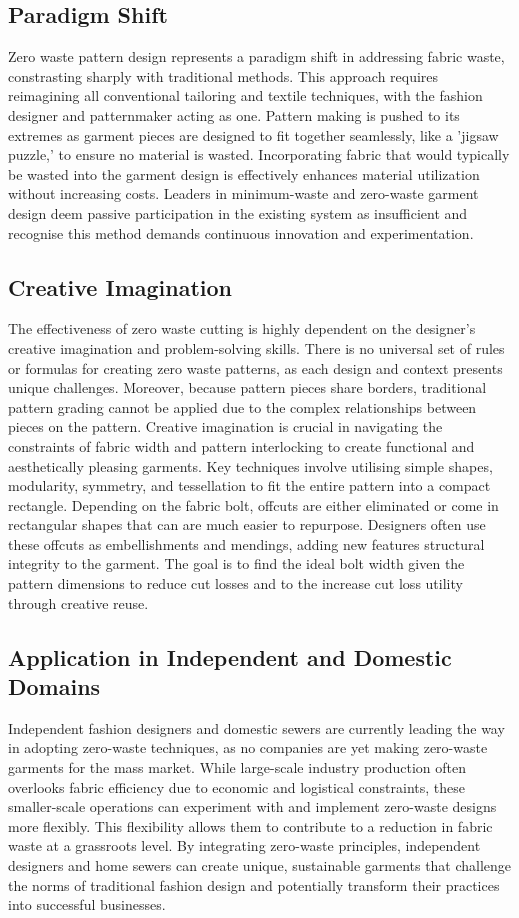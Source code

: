 \subsection{Paradigm Shift}
Zero waste pattern design represents a paradigm shift in addressing fabric waste, constrasting sharply with traditional methods. This approach requires reimagining all conventional tailoring and textile techniques, with the fashion designer and patternmaker acting as one. Pattern making is pushed to its extremes as garment pieces are designed to fit together seamlessly, like a 'jigsaw puzzle,' to ensure no material is wasted. Incorporating fabric that would typically be wasted into the garment design is effectively enhances material utilization without increasing costs. Leaders in minimum-waste and zero-waste garment design deem passive participation in the existing system as insufficient and recognise this method demands continuous innovation and experimentation.

\subsection{Creative Imagination}
The effectiveness of zero waste cutting is highly dependent on the designer's creative imagination and problem-solving skills. There is no universal set of rules or formulas for creating zero waste patterns, as each design and context presents unique challenges. Moreover, because pattern pieces share borders, traditional pattern grading cannot be applied due to the complex relationships between pieces on the pattern. Creative imagination is crucial in navigating the constraints of fabric width and pattern interlocking to create functional and aesthetically pleasing garments. Key techniques involve utilising simple shapes, modularity, symmetry, and tessellation to fit the entire pattern into a compact rectangle. Depending on the fabric bolt, offcuts are either eliminated or come in rectangular shapes that can are much easier to repurpose. Designers often use these offcuts as embellishments and mendings, adding new features structural integrity to the garment. The goal is to find the ideal bolt width given the pattern dimensions to reduce cut losses and to the increase cut loss utility through creative reuse.

\subsection{Application in Independent and Domestic Domains}
Independent fashion designers and domestic sewers are currently leading the way in adopting zero-waste techniques, as no companies are yet making zero-waste garments for the mass market. While large-scale industry production often overlooks fabric efficiency due to economic and logistical constraints, these smaller-scale operations can experiment with and implement zero-waste designs more flexibly. This flexibility allows them to contribute to a reduction in fabric waste at a grassroots level. By integrating zero-waste principles, independent designers and home sewers can create unique, sustainable garments that challenge the norms of traditional fashion design and potentially transform their practices into successful businesses. 

